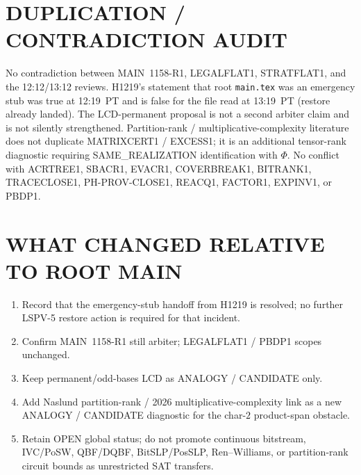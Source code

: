 \documentclass[11pt]{article}
\begin{document}
\section*{DUPLICATION / CONTRADICTION AUDIT}
No contradiction between MAIN~1158-R1, LEGALFLAT1, STRATFLAT1, and the 12:12/13:12
reviews. H1219's statement that root \texttt{main.tex} was an emergency stub was true
at 12:19~PT and is false for the file read at 13:19~PT (restore already landed).
The LCD-permanent proposal is not a second arbiter claim and is not silently
strengthened. Partition-rank / multiplicative-complexity literature does not
duplicate MATRIXCERT1 / EXCESS1; it is an additional tensor-rank diagnostic
requiring SAME\_REALIZATION identification with $\Phi$. No conflict with
ACRTREE1, SBACR1, EVACR1, COVERBREAK1, BITRANK1, TRACECLOSE1, PH-PROV-CLOSE1,
REACQ1, FACTOR1, EXPINV1, or PBDP1.

\section*{WHAT CHANGED RELATIVE TO ROOT MAIN}
\begin{enumerate}
\item Record that the emergency-stub handoff from H1219 is resolved; no further
LSPV-5 restore action is required for that incident.
\item Confirm MAIN~1158-R1 still arbiter; LEGALFLAT1 / PBDP1 scopes unchanged.
\item Keep permanent/odd-bases LCD as ANALOGY / CANDIDATE only.
\item Add Naslund partition-rank / 2026 multiplicative-complexity link as a new
ANALOGY / CANDIDATE diagnostic for the char-$2$ product-span obstacle.
\item Retain OPEN global status; do not promote continuous bitstream, IVC/PoSW,
QBF/DQBF, BitSLP/PosSLP, Ren--Williams, or partition-rank circuit bounds as
unrestricted SAT transfers.
\end{enumerate}
\end{document}
